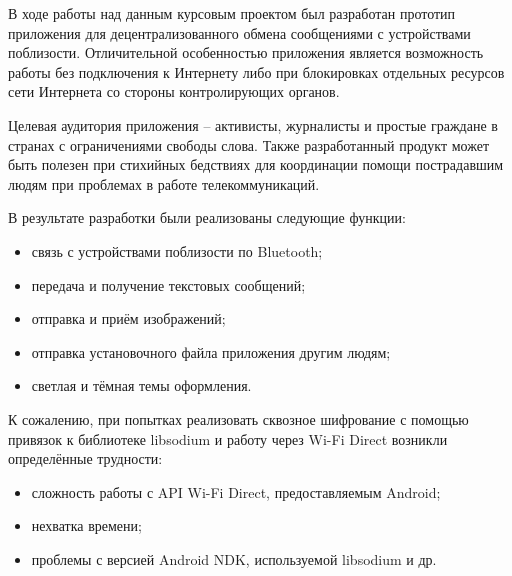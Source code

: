 

В ходе работы над данным курсовым проектом был разработан прототип приложения для децентрализованного обмена сообщениями с устройствами поблизости. Отличительной особенностью приложения является возможность работы без подключения к Интернету либо при блокировках отдельных ресурсов сети Интернета со стороны контролирующих органов.

Целевая аудитория приложения -- активисты, журналисты и простые граждане в странах с ограничениями свободы слова. Также разработанный продукт может быть полезен при стихийных бедствиях для координации помощи пострадавшим людям при проблемах в работе телекоммуникаций.

В результате разработки были реализованы следующие функции:
\begin{itemize}
	\item связь с устройствами поблизости по Bluetooth;
	\item передача и получение текстовых сообщений;
	\item отправка и приём изображений;
	\item отправка установочного файла приложения другим людям;
	\item светлая и тёмная темы оформления.
\end{itemize}

К сожалению, при попытках реализовать сквозное шифрование с помощью привязок к библиотеке libsodium и работу через Wi-Fi Direct возникли определённые трудности:
\begin{itemize}
	\item сложность работы с API Wi-Fi Direct, предоставляемым Android;
	\item нехватка времени;
	\item проблемы с версией Android NDK, используемой libsodium и др.
\end{itemize}
